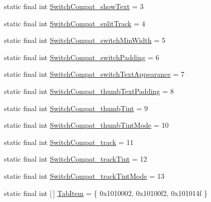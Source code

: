 \begin{DoxyCompactItemize}
\item 
static final int \mbox{\hyperlink{classandroid_1_1support_1_1design_1_1_r_1_1styleable_ae6616c97ccaecf4606cb96741dd3b9f7}{Switch\+Compat\+\_\+show\+Text}} = 3
\item 
static final int \mbox{\hyperlink{classandroid_1_1support_1_1design_1_1_r_1_1styleable_a0a8d5373c3e616fc33bdb6114eecb2b2}{Switch\+Compat\+\_\+split\+Track}} = 4
\item 
static final int \mbox{\hyperlink{classandroid_1_1support_1_1design_1_1_r_1_1styleable_a56e625abaf81738acd70ecb9b67e92e4}{Switch\+Compat\+\_\+switch\+Min\+Width}} = 5
\item 
static final int \mbox{\hyperlink{classandroid_1_1support_1_1design_1_1_r_1_1styleable_a3fc77e330ad9d708010efc7cab9dfe4a}{Switch\+Compat\+\_\+switch\+Padding}} = 6
\item 
static final int \mbox{\hyperlink{classandroid_1_1support_1_1design_1_1_r_1_1styleable_a44eafdc77c077afb0a4a7f61a4361bed}{Switch\+Compat\+\_\+switch\+Text\+Appearance}} = 7
\item 
static final int \mbox{\hyperlink{classandroid_1_1support_1_1design_1_1_r_1_1styleable_aaa78829f09f5da58830c4fd391b6e65c}{Switch\+Compat\+\_\+thumb\+Text\+Padding}} = 8
\item 
static final int \mbox{\hyperlink{classandroid_1_1support_1_1design_1_1_r_1_1styleable_af29c0a9e2e39229c9008ddf122250050}{Switch\+Compat\+\_\+thumb\+Tint}} = 9
\item 
static final int \mbox{\hyperlink{classandroid_1_1support_1_1design_1_1_r_1_1styleable_a1483cb687caf6c588813fbc8a3b2fa7e}{Switch\+Compat\+\_\+thumb\+Tint\+Mode}} = 10
\item 
static final int \mbox{\hyperlink{classandroid_1_1support_1_1design_1_1_r_1_1styleable_a1257745831bcf4c1a0c1a5c8c393c9b2}{Switch\+Compat\+\_\+track}} = 11
\item 
static final int \mbox{\hyperlink{classandroid_1_1support_1_1design_1_1_r_1_1styleable_a654fccb7370c7fa710d8f83343741563}{Switch\+Compat\+\_\+track\+Tint}} = 12
\item 
static final int \mbox{\hyperlink{classandroid_1_1support_1_1design_1_1_r_1_1styleable_aed852d48489f6dd787057a9945d1cd2b}{Switch\+Compat\+\_\+track\+Tint\+Mode}} = 13
\item 
static final int \mbox{[}$\,$\mbox{]} \mbox{\hyperlink{classandroid_1_1support_1_1design_1_1_r_1_1styleable_a244f187ed8d4ed589f36e6db741d19e8}{Tab\+Item}} = \{ 0x1010002, 0x10100f2, 0x101014f \}
\item 

\end{DoxyCompactItemize}
